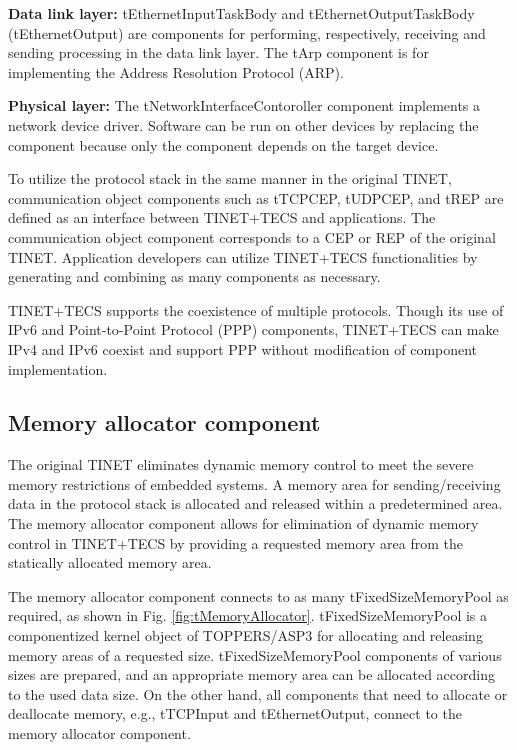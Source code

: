 \documentclass[a4j,12pt,oneside,openany,english]{jsbook}
\begin{document}
{\bf Data link layer:}
tEthernetInputTaskBody and tEthernetOutputTaskBody (tEthernetOutput) are components for performing, respectively, receiving and sending processing in the data link layer.
The tArp component is for implementing the Address Resolution Protocol (ARP).

{\bf Physical layer:}
The tNetworkInterfaceContoroller component implements a network device driver.
Software can be run on other devices by replacing the component because only the component depends on the target device.

To utilize the protocol stack in the same manner in the original TINET, communication object components such as tTCPCEP, tUDPCEP, and tREP are defined as an interface between TINET+TECS and applications.
The communication object component corresponds to a CEP or REP of the original TINET.
Application developers can utilize TINET+TECS functionalities by generating and combining as many components as necessary.

TINET+TECS supports the coexistence of multiple protocols.
Though its use of IPv6 and Point-to-Point Protocol (PPP) components, TINET+TECS can make IPv4 and IPv6 coexist and support PPP without modification of component implementation.

\subsection*{Memory allocator component} 

The original TINET eliminates dynamic memory control to meet the severe memory restrictions of embedded systems.
A memory area for sending/receiving data in the protocol stack is allocated and released within a predetermined area.
The memory allocator component allows for elimination of dynamic memory control in TINET+TECS by providing a requested memory area from the statically allocated memory area.

The memory allocator component connects to as many tFixedSizeMemoryPool as required, as shown in Fig. \ref{fig:tMemoryAllocator}.
tFixedSizeMemoryPool is a componentized kernel object of TOPPERS/ASP3 for allocating and releasing memory areas of a requested size. 
tFixedSizeMemoryPool components of various sizes are prepared, and an appropriate memory area can be allocated according to the used data size.
On the other hand, all components that need to allocate or deallocate memory, e.g., tTCPInput and tEthernetOutput, connect to the memory allocator component.
\end{document}
